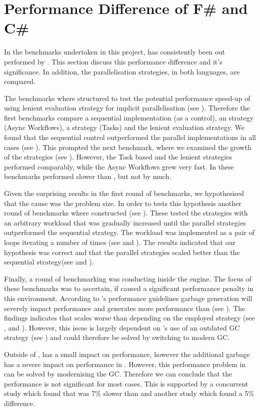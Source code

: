 \section{Performance Difference of F\# and C\#}\label{sec:perf-diff}
In the benchmarks undertaken in this project, \fs has consistently been out performed by \cs. This section discuss this performance difference and it's significance. In addition, the parallelisation strategies, in both languages, are compared.

The benchmarks where structured to test the potential performance speed-up of using lenient evaluation strategy for implicit parallelisation (see ). Therefore the first benchmarks compare a sequential implementation (as a control), an \fs strategy (Async Workflows), a \cs strategy (Tasks) and the lenient evaluation strategy. We found that the sequential control outperformed the parallel implementations in all cases (see ). This prompted the next benchmark, where we examined the growth of the strategies (see ). However, the Task based and the lenient strategies performed comparably, while the Async Workflows grew very fast. In these benchmarks \fs performed slower than \cs, but not by much.

Given the surprising results in the first round of benchmarks, we hypothesised that the cause was the problem size. In order to tests this hypothesis another round of benchmarks where constructed (see ). These tested the strategies with an arbitrary workload that was gradually increased until the parallel strategies outperformed the sequential strategy. The workload was implemented as a pair of  loops iterating a number of times (see  and ). The results indicated that our hypothesis was correct and that the parallel strategies scaled better than the sequential strategy(see  and ).

Finally, a round of benchmarking was conducting inside the \unity engine. The focus of these benchmarks was to ascertain, if \fs caused a significant performance penalty in this environment. According to \unity's performance guidelines\cite{normark2008mapping, unity:fsharp} garbage generation will severely impact performance and \fs generates more performance than \cs (see ). The findings indicates that \fs scales worse than \cs depending on the employed strategy (see ,  and ). However, this issue is largely dependent on \unity's use of an outdated \gls{GC} strategy (see ) and could therefore be solved by switching to modern \gls{GC}.

Outside of \unity, \fs has a small impact on performance, however the additional garbage has a severe impact on performance in \unity. However, this performance problem in \unity can be solved by modernising the \gls{GC}. Therefore we can conclude that the performance is not significant for most cases. This is supported by a concurrent study which found that \fs was 7\% slower than \cs\cite{bolhuis2019gameplay} and another study which found a 5\% difference\cite{maggiore2012formal}.
